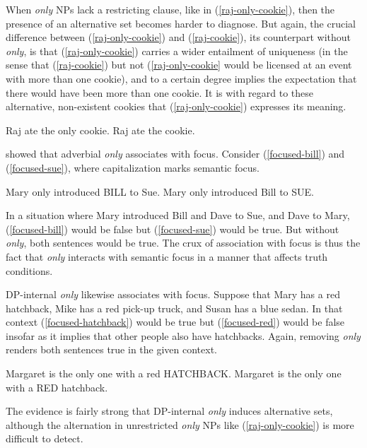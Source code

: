 When \textit{only} NPs lack a restricting clause, like in (\ref{raj-only-cookie}), then the presence of an alternative set becomes harder to diagnose. But again, the crucial difference between (\ref{raj-only-cookie}) and (\ref{raj-cookie}), its counterpart without \textit{only}, is that (\ref{raj-only-cookie}) carries a wider entailment of uniqueness (in the sense that (\ref{raj-cookie}) but not (\ref{raj-only-cookie} would be licensed at an event with more than one cookie), and to a certain degree implies the expectation that there would have been more than one cookie. It is with regard to these alternative, non-existent cookies that (\ref{raj-only-cookie}) expresses its meaning.

\begin{exe}
	\ex \label{raj-only-cookie} Raj ate the only cookie.
	\ex \label{raj-cookie} Raj ate the cookie.
\end{exe}

\citet{rooth85} showed that adverbial \textit{only} associates with focus. Consider (\ref{focused-bill}) and (\ref{focused-sue}), where capitalization marks semantic focus.

\begin{exe}
	\ex \label{focused-bill} Mary only introduced BILL to Sue.
	\ex \label{focused-sue} Mary only introduced Bill to SUE.
\end{exe}

In a situation where Mary introduced Bill and Dave to Sue, and Dave to Mary, (\ref{focused-bill}) would be false but (\ref{focused-sue}) would be true. But without \textit{only}, both sentences would be true. The crux of association with focus is thus the fact that \textit{only} interacts with semantic focus in a manner that affects truth conditions.

DP-internal \textit{only} likewise associates with focus. Suppose that Mary has a red hatchback, Mike has a red pick-up truck, and Susan has a blue sedan. In that context (\ref{focused-hatchback}) would be true but (\ref{focused-red}) would be false insofar as it implies that other people also have hatchbacks. Again, removing \textit{only} renders both sentences true in the given context.

\begin{exe}
	\ex \label{focused-hatchback} Margaret is the only one with a red HATCHBACK.
	\ex \label{focused-red} Margaret is the only one with a RED hatchback.
\end{exe}

The evidence is fairly strong that DP-internal \textit{only} induces alternative sets, although the alternation in unrestricted \textit{only} NPs like (\ref{raj-only-cookie}) is more difficult to detect.

